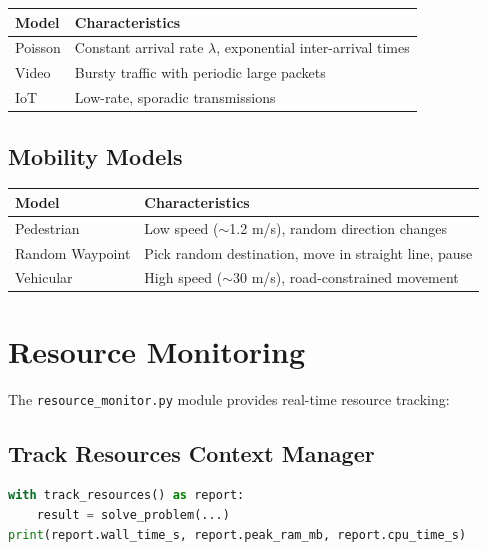 \documentclass[11pt,a4paper]{article}
\begin{document}
\begin{center}
\begin{tabular}{ll}
  \toprule
  \textbf{Model} & \textbf{Characteristics} \\
  \midrule
  Poisson & Constant arrival rate $\lambda$, exponential inter-arrival times \\
  Video & Bursty traffic with periodic large packets \\
  IoT & Low-rate, sporadic transmissions \\
  \bottomrule
\end{tabular}
\end{center}

\subsection{Mobility Models}

\begin{center}
\begin{tabular}{ll}
  \toprule
  \textbf{Model} & \textbf{Characteristics} \\
  \midrule
  Pedestrian & Low speed ($\sim$1.2 m/s), random direction changes \\
  Random Waypoint & Pick random destination, move in straight line, pause \\
  Vehicular & High speed ($\sim$30 m/s), road-constrained movement \\
  \bottomrule
\end{tabular}
\end{center}


\section{Resource Monitoring}

The \texttt{resource\_monitor.py} module provides real-time resource tracking:

\subsection{Track Resources Context Manager}

\begin{lstlisting}[language=Python]
with track_resources() as report:
    result = solve_problem(...)
print(report.wall_time_s, report.peak_ram_mb, report.cpu_time_s)
\end{lstlisting}
\end{document}
